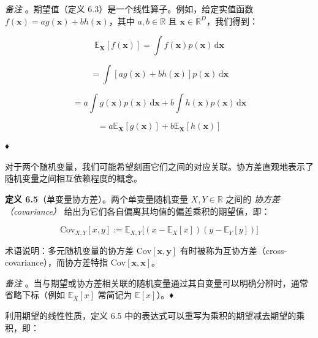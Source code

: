 \emph{备注} 。期望值（定义 6.3）是一个线性算子。例如，给定实值函数 $ f(\boldsymbol{x}) = a g(\boldsymbol{x}) + b h(\boldsymbol{x}) $，其中 $ a, b \in \mathbb{R} $ 且 $ \boldsymbol{x} \in \mathbb{R}^D $，我们得到：

\begin{equation}
\mathbb{E}_{\boldsymbol{X}}[f(\boldsymbol{x})] = \int f(\boldsymbol{x}) p(\boldsymbol{x})\,\mathrm{d}\boldsymbol{x}
\tag{6.34a}\label{eq:6-34a}
\end{equation}

\begin{equation}
= \int [a g(\boldsymbol{x}) + b h(\boldsymbol{x})] p(\boldsymbol{x})\,\mathrm{d}\boldsymbol{x}
\tag{6.34b}\label{eq:6-34b}
\end{equation}

\begin{equation}
= a \int g(\boldsymbol{x}) p(\boldsymbol{x})\,\mathrm{d}\boldsymbol{x} + b \int h(\boldsymbol{x}) p(\boldsymbol{x})\,\mathrm{d}\boldsymbol{x}
\tag{6.34c}\label{eq:6-34c}
\end{equation}

\begin{equation}
= a \mathbb{E}_{\boldsymbol{X}}[g(\boldsymbol{x})] + b \mathbb{E}_{\boldsymbol{X}}[h(\boldsymbol{x})]
\tag{6.34d}\label{eq:6-34d}
\end{equation}

♦

对于两个随机变量，我们可能希望刻画它们之间的对应关联。协方差直观地表示了随机变量之间相互依赖程度的概念。

\textbf{定义 6.5}（单变量协方差）。两个单变量随机变量 $ X, Y \in \mathbb{R} $ 之间的 \emph{协方差（covariance）} 给出为它们各自偏离其均值的偏差乘积的期望值，即：

\begin{equation}
\mathrm{Cov}_{X,Y}[x, y] := \mathbb{E}_{X,Y}\big[(x - \mathbb{E}_X[x])(y - \mathbb{E}_Y[y])\big]
\tag{6.35}\label{eq:6-35}
\end{equation}

术语说明：多元随机变量的协方差 $ \mathrm{Cov}[\boldsymbol{x}, \boldsymbol{y}] $ 有时被称为互协方差（cross-covariance），而协方差特指 $ \mathrm{Cov}[\boldsymbol{x}, \boldsymbol{x}] $。

\emph{备注} 。当与期望或协方差相关联的随机变量通过其自变量可以明确分辨时，通常省略下标（例如 $ \mathbb{E}_X[x] $ 常简记为 $ \mathbb{E}[x] $）。♦

利用期望的线性性质，定义 6.5 中的表达式可以重写为乘积的期望减去期望的乘积，即：

